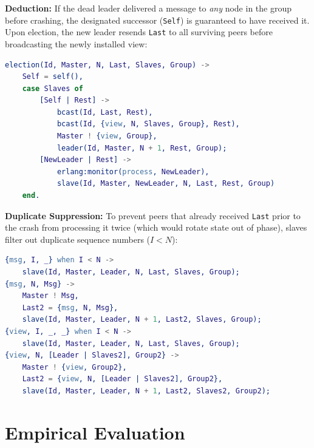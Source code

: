 \documentclass[a4paper, 11pt]{article}
\begin{document}
\noindent \textbf{Deduction:} If the dead leader delivered a message to \emph{any} node in the group before crashing, the designated successor (\texttt{Self}) is guaranteed to have received it. Upon election, the new leader resends \texttt{Last} to all surviving peers before broadcasting the newly installed view:

\begin{lstlisting}[language=erlang]
election(Id, Master, N, Last, Slaves, Group) ->
    Self = self(),
    case Slaves of
        [Self | Rest] ->
            bcast(Id, Last, Rest),
            bcast(Id, {view, N, Slaves, Group}, Rest),
            Master ! {view, Group},
            leader(Id, Master, N + 1, Rest, Group);
        [NewLeader | Rest] ->
            erlang:monitor(process, NewLeader),
            slave(Id, Master, NewLeader, N, Last, Rest, Group)
    end.
\end{lstlisting}

\noindent \textbf{Duplicate Suppression:} To prevent peers that already received \texttt{Last} prior to the crash from processing it twice (which would rotate state out of phase), slaves filter out duplicate sequence numbers ($I < N$):

\begin{lstlisting}[language=erlang]
{msg, I, _} when I < N ->
    slave(Id, Master, Leader, N, Last, Slaves, Group);
{msg, N, Msg} ->
    Master ! Msg,
    Last2 = {msg, N, Msg},
    slave(Id, Master, Leader, N + 1, Last2, Slaves, Group);
{view, I, _, _} when I < N ->
    slave(Id, Master, Leader, N, Last, Slaves, Group);
{view, N, [Leader | Slaves2], Group2} ->
    Master ! {view, Group2},
    Last2 = {view, N, [Leader | Slaves2], Group2},
    slave(Id, Master, Leader, N + 1, Last2, Slaves2, Group2);
\end{lstlisting}

\section{Empirical Evaluation}
\end{document}

